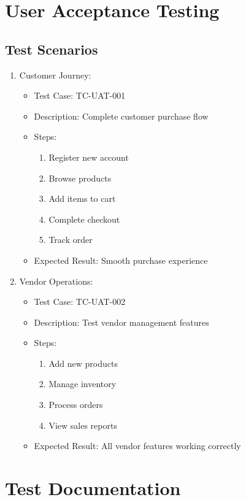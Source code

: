 \section{User Acceptance Testing}
\subsection{Test Scenarios}
\begin{enumerate}
    \item Customer Journey:
    \begin{itemize}
        \item Test Case: TC-UAT-001
        \item Description: Complete customer purchase flow
        \item Steps:
        \begin{enumerate}
            \item Register new account
            \item Browse products
            \item Add items to cart
            \item Complete checkout
            \item Track order
        \end{enumerate}
        \item Expected Result: Smooth purchase experience
    \end{itemize}

    \item Vendor Operations:
    \begin{itemize}
        \item Test Case: TC-UAT-002
        \item Description: Test vendor management features
        \item Steps:
        \begin{enumerate}
            \item Add new products
            \item Manage inventory
            \item Process orders
            \item View sales reports
        \end{enumerate}
        \item Expected Result: All vendor features working correctly
    \end{itemize}
\end{enumerate}

\section{Test Documentation}
